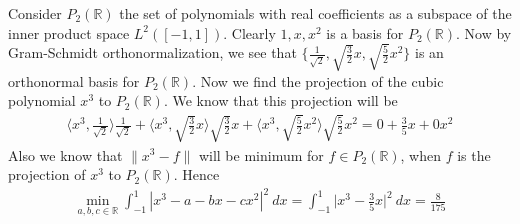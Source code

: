 \documentclass[12pt]{exam}
\theoremstyle{plain} %
\theoremstyle{definition} %
\theoremstyle{remark} %
\begin{document}
\begin{questions}
  \question
  \begin{solution}
    Consider $P_2(\mathbb{R})$ the set of polynomials with real
    coefficients as a subspace of the inner product space $L^{2}([-1,
    1])$. Clearly $1, x, x^2$ is a basis for $P_2(\mathbb{R})$. Now
    by Gram-Schmidt orthonormalization, we see that $\big\{ \frac{1}{\sqrt 2},
    \sqrt{\frac{3}{2}}x, \sqrt{\frac{5}{2}}x^2 \big\}$ is an
    orthonormal basis for $P_2(\mathbb{R})$. Now we find the
    projection of the cubic polynomial $x^3$ to $P_2(\mathbb{R})$. We
    know that this projection will be
    \begin{align*}
      \Big \langle x^3 , \frac{1}{\sqrt{2}} \Big \rangle \frac{1}{\sqrt{2}} +
      \Big \langle x^3 , \sqrt{\frac{3}{2}} x \Big \rangle \sqrt{\frac{3}{2}} x
      + \Big \langle x^3 , \sqrt{\frac{5}{2}} x^2 \Big \rangle
      \sqrt{\frac{5}{2}} x^2 = 0 + \frac{3}{5}x + 0 x^2
    \end{align*}
    Also we know that $\|x^3 - f\|$ will be minimum for $f \in
    P_2(\mathbb{R})$, when $f$ is the projection of $x^3$ to
    $P_2(\mathbb{R})$. Hence
    \begin{align*}
      \min_{a, b, c \in \mathbb{R}} \int_{-1}^{1} |x^3 - a - bx -
      cx^2|^2 \ dx = \int_{-1}^{1} \Big|x^3 - \frac{3}{5}x\Big|^2
      \ dx = \frac{8}{175}
    \end{align*}
  \end{solution}

\end{questions}
\printbibliography[heading=bibintoc]
\end{document}

